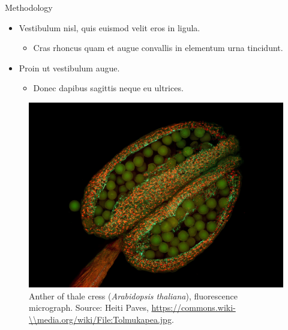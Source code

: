\documentclass{beamer} %
\begin{document}
\begin{frame}[t]
\begin{columns}[t]
\begin{column}{0.465\textwidth}

\begin{block}{Methodology}
	\begin{itemize}
		\item Vestibulum nisl, quis euismod velit eros in ligula.
		\begin{itemize}
			\item Cras rhoncus quam et augue convallis in elementum urna tincidunt.
		\end{itemize}
		\item Proin ut vestibulum augue.
		\begin{itemize}
			\item Donec dapibus sagittis neque eu ultrices.
		\end{itemize}
	\end{itemize}
	
	\bigskip %
	
	\begin{figure}
		\centering %
		\includegraphics[width=0.65\linewidth]{Tolmukapea.jpg}
		\caption{Anther of thale cress (\textit{Arabidopsis thaliana}), fluorescence micrograph. Source: Heiti Paves, \url{https://commons.wiki-\\media.org/wiki/File:Tolmukapea.jpg}.}
	\end{figure}
\end{block}



\end{column}
\end{columns}
\end{frame}
\end{document}
